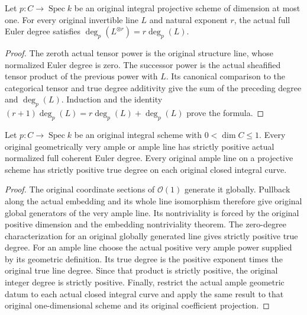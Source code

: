 \begin{lemma}
\label{lem:fc-original-line-tensor-power-degree}
\leanok
{}
Let $p:C\to\operatorname{Spec}k$ be an original integral projective scheme
of dimension at most one. For every original invertible line $L$ and
natural exponent $r$, the actual full Euler degree satisfies
$\deg_p(L^{\otimes r})=r\deg_p(L)$.
\end{lemma}
\begin{proof}
The zeroth actual tensor power is the original structure line, whose
normalized Euler degree is zero. The successor power is the actual
sheafified tensor product of the previous power with $L$. Its canonical
comparison to the categorical tensor and true degree additivity give
the sum of the preceding degree and $\deg_p(L)$. Induction and the
identity $(r+1)\deg_p(L)=r\deg_p(L)+\deg_p(L)$ prove the formula.
\end{proof}

\begin{theorem}
\label{thm:fc-original-geometric-ample-curve-degree-positive}
\leanok
{}
Let $p:C\to\operatorname{Spec}k$ be an original integral scheme with
$0<\dim C\leq1$. Every original geometrically very ample or ample line
has strictly positive actual normalized full coherent Euler degree.
Every original ample line on a projective scheme has strictly positive
true degree on each original closed integral curve.
\end{theorem}
\begin{proof}
The original coordinate sections of $\mathcal O(1)$ generate it globally.
Pullback along the actual embedding and its whole line isomorphism
therefore give original global generators of the very ample line. Its
nontriviality is forced by the original positive dimension and the
embedding nontriviality theorem. The zero-degree characterization for
an original globally generated line gives strictly positive true degree.
For an ample line choose the actual positive very ample power supplied
by its geometric definition. Its true degree is the positive exponent
times the original true line degree. Since that product is strictly
positive, the original integer degree is strictly positive. Finally,
restrict the actual ample geometric datum to each actual closed
integral curve and apply the same result to that original one-dimensional
scheme and its original coefficient projection.
\end{proof}
